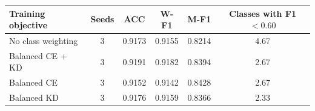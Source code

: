 \begin{tabular}{p{4.5cm}ccccc}
\toprule
Training objective & Seeds & ACC & W-F1 & M-F1 & Classes with F1$<0.60$ \\
\midrule
No class weighting & 3 & 0.9173 & 0.9155 & 0.8214 & 4.67 \\
Balanced CE + KD & 3 & 0.9191 & 0.9182 & 0.8394 & 2.67 \\
Balanced CE & 3 & 0.9152 & 0.9142 & 0.8428 & 2.67 \\
Balanced KD & 3 & 0.9176 & 0.9159 & 0.8366 & 2.33 \\
\bottomrule
\end{tabular}
